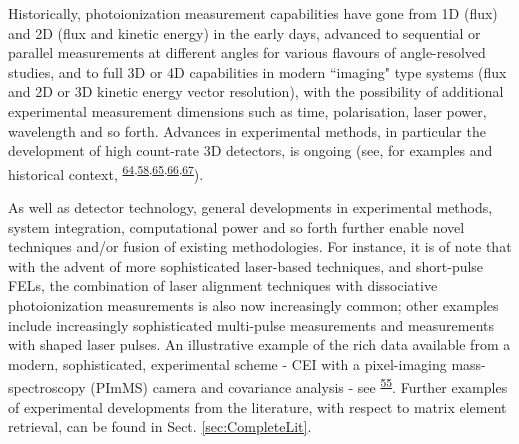 \documentclass[10pt]{article}
\begin{document}
Historically, photoionization measurement capabilities have gone from 1D (flux) and 2D (flux and kinetic energy) in the early days, advanced to sequential or parallel measurements at different angles for various flavours of angle-resolved studies, and to full 3D or 4D capabilities in modern ``imaging" type systems (flux and 2D or 3D kinetic energy vector resolution), with the possibility of additional experimental measurement dimensions such as time, polarisation, laser power, wavelength and so forth. Advances in experimental methods, in particular the development of high count-rate 3D detectors, is ongoing (see, for examples and historical context, \textsuperscript{\hyperref[csl:64]{64},\hyperref[csl:58]{58},\hyperref[csl:65]{65},\hyperref[csl:66]{66},\hyperref[csl:67]{67}}). 

As well as detector technology, general developments in experimental methods, system integration, computational power and so forth further enable novel techniques and/or fusion of existing methodologies. For instance, it is of note that with the advent of more sophisticated laser-based techniques, and short-pulse FELs, the combination of laser alignment techniques with dissociative photoionization measurements is also now increasingly common; other examples include increasingly sophisticated multi-pulse measurements and measurements with shaped laser pulses. An illustrative example of the rich data available from a modern, sophisticated, experimental scheme - CEI with a pixel-imaging mass-spectroscopy (PImMS) camera and covariance analysis - see \textsuperscript{\hyperref[csl:55]{55}}. Further examples of experimental developments from the literature, with respect to matrix element retrieval, can be found in Sect. \ref{sec:CompleteLit}.


\end{document}
